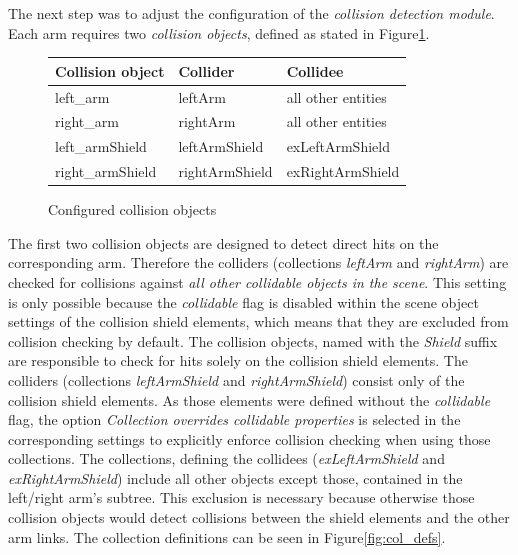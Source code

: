 The next step was to adjust the configuration of the \emph{collision detection module}. Each arm requires two \emph{collision objects}, defined as stated in Figure\ref{fig:col_groups}. 
\begin{figure}
  \centering
  \label{fig:col_groups}
  \begin{tabular}[h]{|l|l|l|} \hline
	\textbf{Collision object} & \textbf{Collider} & \textbf{Collidee} \\ \hline
	left\_arm & leftArm & all other entities \\
	right\_arm & rightArm & all other entities \\
	left\_armShield & leftArmShield & exLeftArmShield \\
	right\_armShield & rightArmShield & exRightArmShield \\ \hline
  \end{tabular}
  \caption{Configured collision objects}
\end{figure}
The first two collision objects are designed to detect direct hits on the corresponding arm.  
Therefore the colliders (collections \emph{leftArm} and \emph{rightArm}) are checked for collisions against \emph{all other collidable objects in the scene}. This setting is only possible because the \emph{collidable} flag is disabled within the scene object settings of the collision shield elements, which means that they are excluded from collision checking by default. The collision objects, named with the \emph{Shield} suffix are responsible to check for hits solely on the collision shield elements. The colliders (collections \emph{leftArmShield} and \emph{rightArmShield}) consist only of the collision shield elements. As those elements were defined without the \emph{collidable} flag, the option \emph{Collection overrides collidable properties} is selected in the corresponding settings to explicitly enforce collision checking when using those collections. The collections, defining the collidees (\emph{exLeftArmShield} and \emph{exRightArmShield}) include all other objects except those, contained in the left/right arm's subtree. This exclusion is necessary because otherwise those collision objects would detect collisions between the shield elements and the other arm links. The collection definitions can be seen in Figure\ref{fig:col_defs}.
